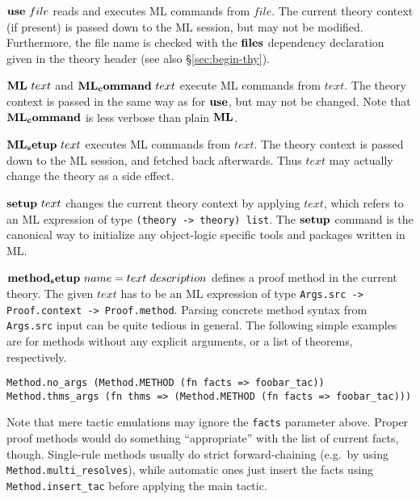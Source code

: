 \begin{descr}
\item [${\mathord{\mathbf{use}}}~file$] reads and executes ML commands from $file$.
  The current theory context (if present) is passed down to the ML session,
  but may not be modified.  Furthermore, the file name is checked with the
  ${\mathord{\mathbf{files}}}$ dependency declaration given in the theory header (see
  also \S\ref{sec:begin-thy}).
  
\item [${\mathord{\mathbf{ML}}}~text$ and ${\mathord{\mathbf{ML_command}}}~text$] execute ML
  commands from $text$.  The theory context is passed in the same way as for
  ${\mathord{\mathbf{use}}}$, but may not be changed.  Note that
  ${\mathord{\mathbf{ML_command}}}$ is less verbose than plain ${\mathord{\mathbf{ML}}}$.
  
\item [${\mathord{\mathbf{ML_setup}}}~text$] executes ML commands from $text$.  The
  theory context is passed down to the ML session, and fetched back
  afterwards.  Thus $text$ may actually change the theory as a side effect.
  
\item [${\mathord{\mathbf{setup}}}~text$] changes the current theory context by
  applying $text$, which refers to an ML expression of type
  \texttt{(theory~->~theory)~list}.  The ${\mathord{\mathbf{setup}}}$ command is the
  canonical way to initialize any object-logic specific tools and packages
  written in ML.
  
\item [${\mathord{\mathbf{method_setup}}}~name = text~description$] defines a proof
  method in the current theory.  The given $text$ has to be an ML expression
  of type \texttt{Args.src -> Proof.context -> Proof.method}.  Parsing
  concrete method syntax from \texttt{Args.src} input can be quite tedious in
  general.  The following simple examples are for methods without any explicit
  arguments, or a list of theorems, respectively.

{\footnotesize
\begin{verbatim}
Method.no_args (Method.METHOD (fn facts => foobar_tac))
Method.thms_args (fn thms => (Method.METHOD (fn facts => foobar_tac)))
\end{verbatim}
}

Note that mere tactic emulations may ignore the \texttt{facts} parameter
above.  Proper proof methods would do something ``appropriate'' with the list
of current facts, though.  Single-rule methods usually do strict
forward-chaining (e.g.\ by using \texttt{Method.multi_resolves}), while
automatic ones just insert the facts using \texttt{Method.insert_tac} before
applying the main tactic.
\end{descr}


